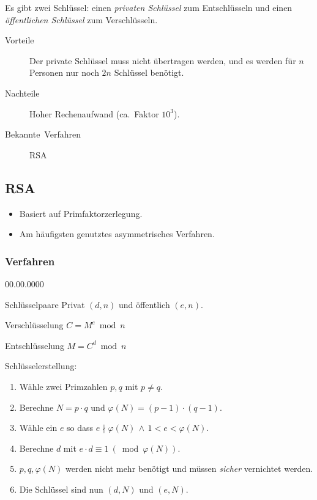 Es gibt zwei Schlüssel: einen \emph{privaten Schlüssel} zum Entschlüsseln und einen \emph{öffentlichen Schlüssel} zum Verschlüsseln.
\begin{description}
  \item [{Vorteile}]           Der private Schlüssel muss nicht übertragen werden, und es werden für $n$ Personen nur noch $2n$ Schlüssel benötigt.
  \item [{Nachteile}]          Hoher Rechenaufwand (ca.~Faktor $10^3$).
  \item [{Bekannte~Verfahren}] RSA
\end{description}

\subsection{RSA}
\begin{itemize}
  \item {}Basiert auf Primfaktorzerlegung.
  \item Am häufigsten genutztes asymmetrisches Verfahren.
\end{itemize}

\subsubsection{Verfahren}
\begin{labeling}{00.00.0000}
  \item [{Schlüsselpaare}]  Privat $(d,n)$ und öffentlich $(e,n)$.
  \item [{Verschlüsselung}] $C=M^{e}\bmod  n$
  \item [{Entschlüsselung}] $M=C^{d}\bmod  n$
\end{labeling}

Schlüsselerstellung:
\begin{enumerate}
  \item Wähle zwei Primzahlen $p,q$ mit $p\neq q$.
  \item Berechne $N=p\cdot q$ und $\varphi(N)=(p-1)\cdot(q-1)$.
  \item Wähle ein $e$ so dass $e\nmid\varphi(N)\,\land\,1<e<\varphi(N)$.
  \item Berechne $d$ mit $e\cdot d\equiv1\:(\bmod\varphi(N))$.
  \item $p,q,\varphi(N)$ werden nicht mehr benötigt und müssen \emph{sicher} vernichtet werden.
  \item Die Schlüssel sind nun $(d,N)$ und $(e,N)$.
\end{enumerate}

